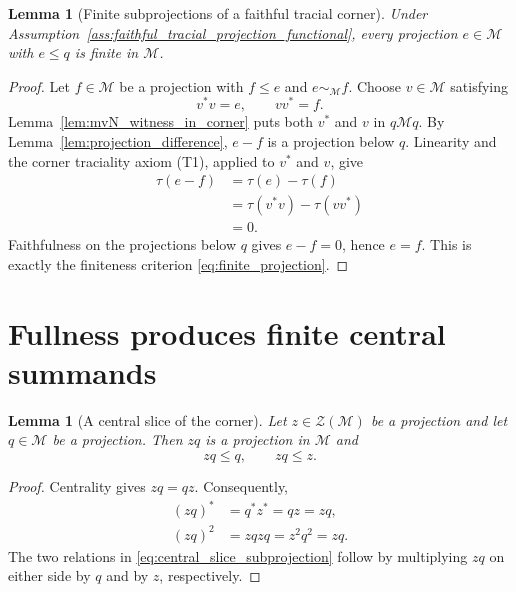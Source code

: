 \documentclass[11pt,reqno]{amsart}
\numberwithin{equation}{section}
\newtheorem{lemma}[theorem]{Lemma}
\theoremstyle{definition}
\theoremstyle{remark}
\newcommand{\cM}{\mathcal M}
\newcommand{\cZ}{\mathcal Z}
\begin{document}
\begin{lemma}[Finite subprojections of a faithful tracial corner]
\label{lem:finite_subprojection_of_tracial_corner}
Under Assumption~\ref{ass:faithful_tracial_projection_functional}, every
projection $e\in\cM$ with $e\leq q$ is finite in $\cM$.
\end{lemma}

\begin{proof}
Let $f\in\cM$ be a projection with $f\leq e$ and
$e\sim_{\cM}f$.  Choose $v\in\cM$ satisfying
  \begin{equation}
    v^*v=e,
    \qquad
  vv^*=f.
  \label{eq:corner_equivalence_witness}
  \end{equation}
Lemma~\ref{lem:mvN_witness_in_corner} puts both $v^*$ and $v$ in $q\cM q$.
By Lemma~\ref{lem:projection_difference}, $e-f$ is a projection below $q$.
Linearity and the corner traciality axiom (T1), applied to $v^*$ and $v$, give
\begin{equation}
  \begin{aligned}
    \tau(e-f)
    &=\tau(e)-\tau(f)\\
    &=\tau(v^*v)-\tau(vv^*)\\
    &=0.
  \end{aligned}
  \label{eq:trace_difference_zero}
\end{equation}
Faithfulness on the projections below $q$ gives $e-f=0$, hence $e=f$.  This
is exactly the finiteness criterion \eqref{eq:finite_projection}.
\end{proof}

\section{Fullness produces finite central summands}
\label{sec:semifiniteness}

\begin{lemma}[A central slice of the corner]
\label{lem:central_slice}
Let $z\in\cZ(\cM)$ be a projection and let $q\in\cM$ be a projection.
Then $zq$ is a projection in $\cM$ and
\begin{equation}
  zq\leq q,
  \qquad
  zq\leq z.
  \label{eq:central_slice_subprojection}
\end{equation}
\end{lemma}

\begin{proof}
Centrality gives $zq=qz$.  Consequently,
\begin{align}
  (zq)^*&=q^*z^*=qz=zq,\\
  (zq)^2&=zqzq=z^2q^2=zq.
  \label{eq:central_slice_projection}
\end{align}
The two relations in \eqref{eq:central_slice_subprojection} follow by
multiplying $zq$ on either side by $q$ and by $z$, respectively.
\end{proof}
\end{document}
